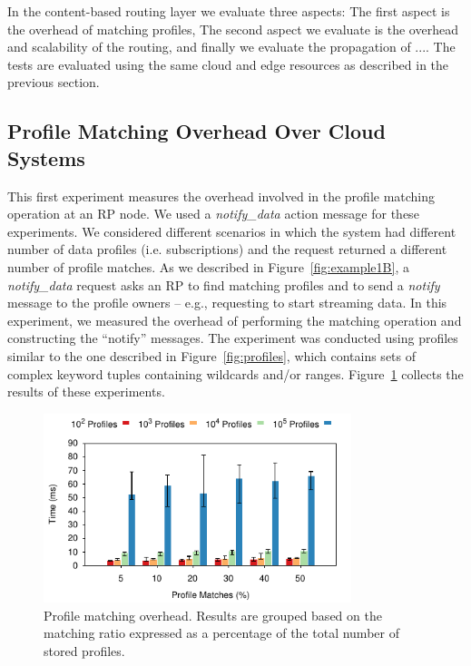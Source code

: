 In the content-based routing layer we evaluate three aspects: The first aspect is the overhead of matching profiles, The second aspect we evaluate is the overhead and scalability of the routing, and finally we evaluate the propagation of ....  The tests are evaluated using the same cloud and edge resources as described in the previous section.

\subsection{Profile Matching Overhead Over Cloud Systems}

This first experiment measures the overhead involved in the profile matching operation at an RP node. We used a {\it notify\_data} action message for these experiments. We considered different scenarios in which the system had different number of data profiles (i.e. subscriptions) and the request returned a different number of profile matches. As we described in Figure~\ref{fig:example1B}, a {\it notify\_data} request asks an RP to find matching profiles and to send a {\it notify} message to the profile owners -- e.g., requesting to start streaming data. In this experiment, we measured the overhead of performing the matching operation and constructing the ``notify'' messages.  The experiment was conducted using profiles similar to the one described in Figure~\ref{fig:profiles}, which contains sets of complex keyword tuples containing wildcards and/or ranges. Figure~\ref{fig:profileQuery} collects the results of these experiments. 

\begin{figure}[htb!]
  \centering
    \includegraphics[width=0.8\textwidth]{Figures/profileQuery.pdf}
  \caption{Profile matching overhead. Results are grouped based on the matching ratio expressed as a percentage of the total number of stored profiles.} \label{fig:profileQuery}
\end{figure}

